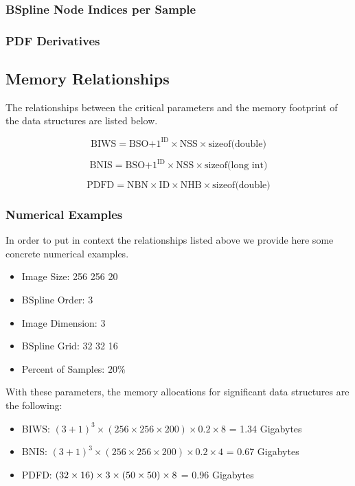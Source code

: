 \documentclass{InsightArticle}
\begin{document}
\subsubsection{BSpline Node Indices per Sample}
\subsubsection{PDF Derivatives}

\subsection{Memory Relationships}

The relationships between the critical parameters and the memory footprint of
the data structures are listed below.

\begin{equation}
\mbox{BIWS} = \mbox{BSO+1}^{\mbox{ID}} \times \mbox{NSS} \times \mbox{sizeof(double)}
\end{equation}

\begin{equation}
\mbox{BNIS} = \mbox{BSO+1}^{\mbox{ID}} \times \mbox{NSS} \times \mbox{sizeof(long int)}
\end{equation}

\begin{equation}
\mbox{PDFD} = \mbox{NBN} \times \mbox{ID} \times \mbox{NHB} \times  \mbox{sizeof(double)}
\end{equation}


\subsubsection{Numerical Examples}

In order to put in context the relationships listed above we provide here some
concrete numerical examples.

\begin{itemize}
\item Image Size: 256 256 20
\item BSpline Order: 3
\item Image Dimension: 3
\item BSpline Grid: 32 32 16
\item Percent of Samples: $20\%$
\end{itemize}

With these parameters, the memory allocations for significant data structures
are the following:


\begin{itemize}
\item BIWS: $(3+1)^3 \times (256 \times 256 \times 200 ) \times 0.2 \times 8 $ = 1.34 Gigabytes 
\item BNIS: $(3+1)^3 \times (256 \times 256 \times 200 ) \times 0.2 \times 4 $ = 0.67 Gigabytes 
\item PDFD: $(32 \time 32 \times 16 ) \times 3 \times ( 50 \times 50 ) \times 8$ = 0.96 Gigabytes
\end{itemize}
\end{document}
